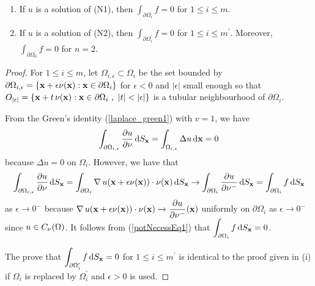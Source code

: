\begin{prop} \label{pot_nec_Nprobl}
\begin{enumerate}
\item If $u$ is a solution of (N1), then
$\displaystyle \int_{\partial \Omega_i} f =0$ for $1 \leq i \leq m$.
\item If $u$ is a solution of (N2), then
$\displaystyle \int_{\partial \Omega^{\prime}_i} f =0$ for
$\displaystyle 1 \leq i \leq m^{\prime}$.
Moreover, $\displaystyle \int_{\partial \Omega^{\prime}_0} f =0$ for $n=2$.
\end{enumerate}
\end{prop}

\begin{proof}
For $1\leq i \leq m$, let $\Omega_{i,\epsilon} \subset \Omega_i$ be
the set bounded by
$\displaystyle \partial \Omega_{i,\epsilon}
= \{\mathbf{x} + \epsilon \mathbf{\nu}(\mathbf{x}) : \mathbf{x}
\in \partial \Omega_i \}$ for $\epsilon<0$ and $|\epsilon|$ small
enough so that
$\displaystyle
O_{|\epsilon|} = \left\{ \VEC{x} + t\, \VEC{\nu}(\VEC{x}) : \VEC{x} \in
  \partial \Omega_i \ , \ |t|<|\epsilon| \right\}$ is a tubular
neighbourhood of $\partial \Omega_i$.

From the Green's identity (\ref{laplace_green1}) with $v=1$, we have
\begin{equation} \label{potNecessEq1}
\int_{\partial \Omega_{i,\epsilon}} \frac{\partial{u}}{\partial \mathbf{\nu}} \,\mathrm{d}{S}_{\mathbf{x}}
= \int_{\Omega_{i,\epsilon}} \Delta u \,\mathrm{d}{\mathbf{x}} = 0
\end{equation}
because $\Delta u = 0$ on $\Omega_i$.  However, we have that
\[
\int_{\partial \Omega_{i,\epsilon}} \frac{\partial{u}}{\partial \mathbf{\nu}} \,\mathrm{d}{S}_{\mathbf{x}}
= \int_{\partial \Omega_i} \operatorname{\nabla} u(\mathbf{x} + \epsilon \mathbf{\nu}(\mathbf{x}))
\cdot \mathbf{\nu}(\mathbf{x}) \,\mathrm{d}{S}_{\mathbf{x}}
\rightarrow \int_{\partial \Omega_i} \frac{\partial{u}}{\partial \mathbf{\nu}^-} \,\mathrm{d}{S}_{\mathbf{x}}
= \int_{\partial \Omega_i} f \,\mathrm{d}{S}_{\mathbf{x}}
\]
as $\epsilon \rightarrow 0^-$ because
$\displaystyle
\operatorname{\nabla} u(\mathbf{x} + \epsilon \mathbf{\nu}(\mathbf{x})) \cdot \mathbf{\nu}(\mathbf{x})
\to \frac{\partial{u}}{\partial \mathbf{\nu}^-}(\mathbf{x})$ uniformly on $\partial \Omega_i$ as
$\epsilon \to 0^-$ since $u \in C_{\mathbf{\nu}}(\Omega)$.  It follows
from (\ref{potNecessEq1}) that
$\displaystyle \int_{\partial \Omega_i} f \,\mathrm{d}{S}_{\mathbf{x}} = 0$.

 The prove that
$\displaystyle \int_{\partial \Omega^{\prime}_i} f \,\mathrm{d}{S}_{\mathbf{x}} = 0$ for
$\displaystyle 1 \leq i \leq m^{\prime}$ is identical to the proof given in
(i) if $\Omega_i$ is replaced by $\displaystyle \Omega_i^{\prime}$ and
$\epsilon >0$ is used.


\end{proof}
